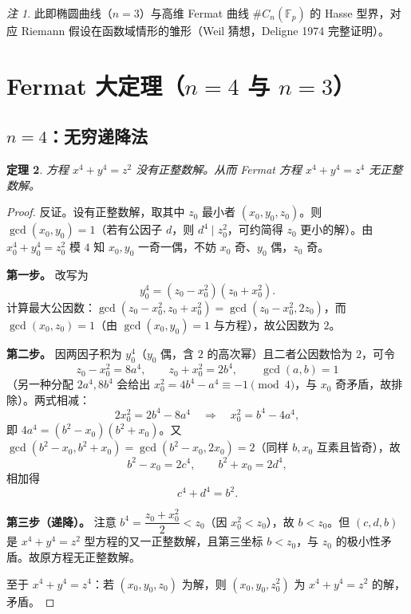 \documentclass{article}
\theoremstyle{plain}
\newtheorem{thm}{定理}[section]
\theoremstyle{definition}
\theoremstyle{remark}
\newtheorem{rem}[thm]{注}
\begin{document}
\begin{rem}
  此即椭圆曲线（$n=3$）与高维 Fermat 曲线 $\#C_n(\mathbb{F}_p)$ 的 Hasse 型界，对应 Riemann 假设在函数域情形的雏形（Weil 猜想，Deligne 1974 完整证明）。
\end{rem}

\section{Fermat 大定理（$n=4$ 与 $n=3$）}\label{sec:flt}

\subsection{$n=4$：无穷递降法}

\begin{thm}\label{thm:flt4-aux}
  方程 $x^4+y^4=z^2$ 没有正整数解。从而 Fermat 方程 $x^4+y^4=z^4$ 无正整数解。
\end{thm}

\begin{proof}
  反证。设有正整数解，取其中 $z_0$ 最小者 $(x_0,y_0,z_0)$。则 $\gcd(x_0,y_0)=1$（若有公因子 $d$，则 $d^4\mid z_0^2$，可约简得 $z_0$ 更小的解）。由 $x_0^4+y_0^4=z_0^2$ 模 $4$ 知 $x_0,y_0$ 一奇一偶，不妨 $x_0$ 奇、$y_0$ 偶，$z_0$ 奇。

  \textbf{第一步。} 改写为
  \[
    y_0^4=(z_0-x_0^2)(z_0+x_0^2).
  \]
  计算最大公因数：$\gcd(z_0-x_0^2,z_0+x_0^2)=\gcd(z_0-x_0^2,2z_0)$，而 $\gcd(x_0,z_0)=1$（由 $\gcd(x_0,y_0)=1$ 与方程），故公因数为 $2$。

  \textbf{第二步。} 因两因子积为 $y_0^4$（$y_0$ 偶，含 $2$ 的高次幂）且二者公因数恰为 $2$，可令
  \[
    z_0-x_0^2=8a^4,\qquad z_0+x_0^2=2b^4,\qquad\gcd(a,b)=1
  \]
  （另一种分配 $2a^4,8b^4$ 会给出 $x_0^2=4b^4-a^4\equiv-1\pmod4$，与 $x_0$ 奇矛盾，故排除）。两式相减：
  \[
    2x_0^2=2b^4-8a^4\quad\Longrightarrow\quad x_0^2=b^4-4a^4,
  \]
  即 $4a^4=(b^2-x_0)(b^2+x_0)$。又 $\gcd(b^2-x_0,b^2+x_0)=\gcd(b^2-x_0,2x_0)=2$（同样 $b,x_0$ 互素且皆奇），故
  \[
    b^2-x_0=2c^4,\qquad b^2+x_0=2d^4,
  \]
  相加得
  \[
    c^4+d^4=b^2.
  \]

  \textbf{第三步（递降）。} 注意 $b^4=\dfrac{z_0+x_0^2}{2}<z_0$（因 $x_0^2<z_0$），故 $b<z_0$。但 $(c,d,b)$ 是 $x^4+y^4=z^2$ 型方程的又一正整数解，且第三坐标 $b<z_0$，与 $z_0$ 的极小性矛盾。故原方程无正整数解。

  至于 $x^4+y^4=z^4$：若 $(x_0,y_0,z_0)$ 为解，则 $(x_0,y_0,z_0^2)$ 为 $x^4+y^4=z^2$ 的解，矛盾。
\end{proof}
\end{document}
